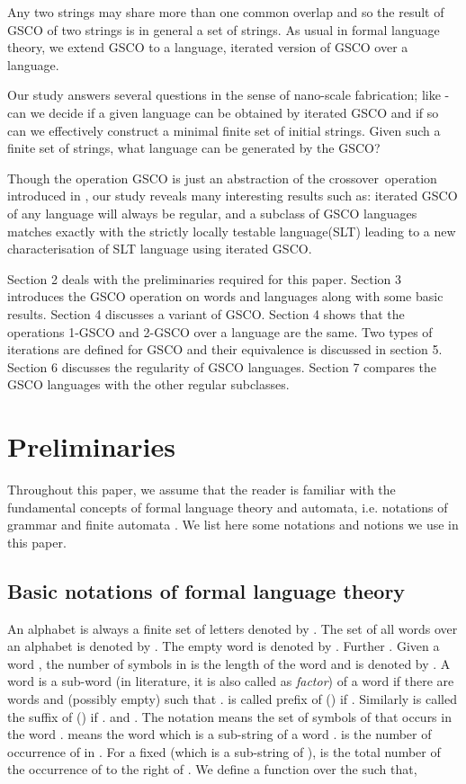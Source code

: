 \documentclass{llncs}
\newcommand{\sa}{crossover~}
\begin{document}
\par Any two strings may share more than one common overlap and so the result of GSCO
 of two strings is in general a set of strings. As usual in formal language theory,
  we extend GSCO to a language, iterated version of GSCO over a language.

\par Our study answers several questions in the sense of nano-scale fabrication;
like - can we decide if a given language can be obtained by iterated
GSCO and if so
 can we effectively construct a minimal finite set of initial strings. Given such
 a finite set of strings, what language can be generated by the
 GSCO?

\par Though the operation GSCO is just an abstraction of the  \sa operation introduced
 in \cite{mitrana1}, our study reveals many interesting results such as: iterated GSCO
  of any
 language will always be regular, and a subclass of GSCO languages matches exactly with
 the strictly locally testable
 language(SLT) \cite{Mc} leading to a new characterisation of SLT language using
 iterated GSCO.

\par Section 2 deals with the preliminaries required for this paper.
Section 3 introduces the GSCO operation on words and languages along
with some basic results. Section 4 discusses a variant of GSCO.
Section 4 shows that the operations 1-GSCO and 2-GSCO over a
language  are the same. Two types of iterations are defined for
GSCO and their equivalence is discussed in section 5. Section 6
discusses the regularity of GSCO languages. Section 7 compares the
GSCO languages with the other regular subclasses.
\section{Preliminaries}
\par Throughout this paper, we assume that the reader is familiar with
the fundamental concepts of formal language theory and automata, i.e.
 notations of grammar and finite automata \cite{HMU}.
We list here some notations and notions we use in this paper.
\subsection{Basic notations  of formal language theory}
\par An alphabet is always a finite set of letters denoted by . The set of
all words over an alphabet  is denoted by . The empty
word is denoted by . Further . Given
a word , the number of
 symbols in  is the length of the word and is denoted by . A word 
  is a sub-word (in literature, it is also called as {\it factor}) of  a word
    if there are words  and  (possibly empty) such that .
     is called prefix  of  () if . Similarly  is called the
     suffix of  () if .   and
     . The notation  means the set of
     symbols of  that
occurs in the word .   means the word  which is a sub-string
 of a word .  is the number of occurrence of  in .
  For a fixed  (which is a sub-string of ), 
  is the total number of the occurrence of  to the right of .
  We define a function  over the  such that,
\end{document}
